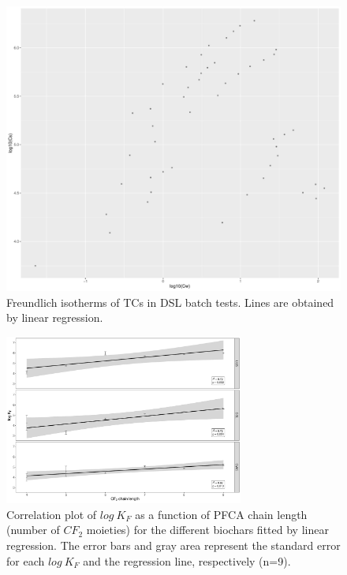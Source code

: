 \begin{figure}
    \centering
    \includegraphics[width=\textwidth]{R/figs/DSL_facet_isotherm.pdf}
    \caption{Freundlich isotherms of TCs in DSL batch tests. Lines are obtained by linear regression.}
    \label{fig:DSL_isotherm2}
\end{figure}

\begin{figure}[tb]
    \centering
    \includegraphics[width=0.7\textwidth]{R/figs/chainlength_KF.pdf}
    \caption{Correlation plot of $log~K_F$ as a function of PFCA chain length (number of $CF_2$ moieties) for the different biochars fitted by linear regression. The error bars and gray area represent the standard error for each $log~K_F$ and the regression line, respectively (n=9).}
    \label{fig:chainlength}
\end{figure}

